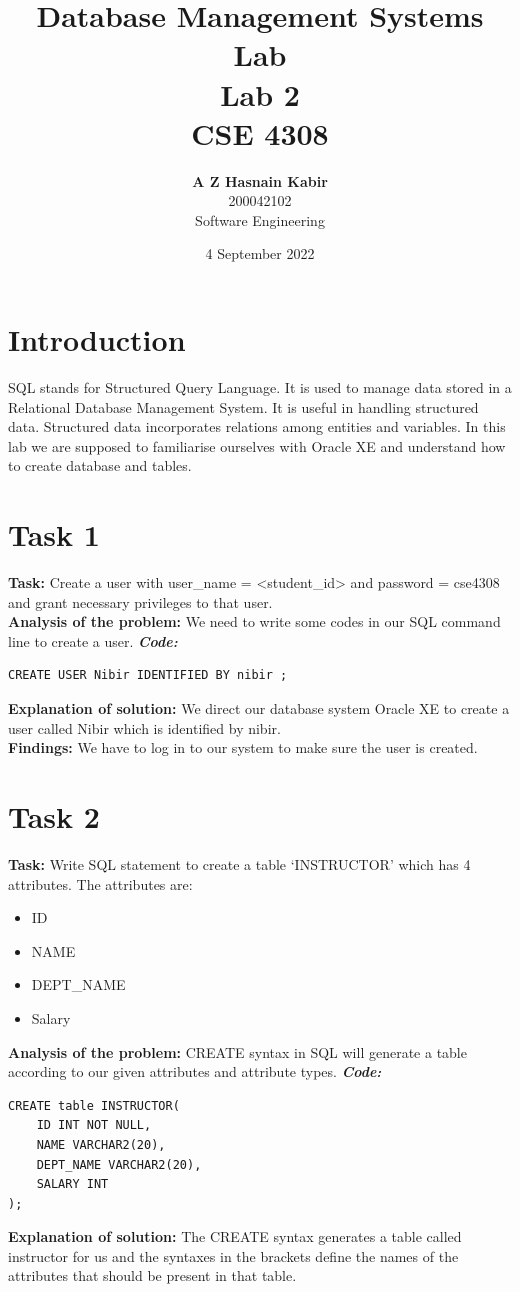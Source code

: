 \documentclass[a4paper, left=1in, right=1in,12pt]{article}
\title{Database Management Systems Lab\\Lab 2\\CSE 4308}
\author{\textbf{\Large A Z Hasnain Kabir}\\\Large 200042102\\\Large Software Engineering}
\date{4 September 2022}
\begin{document}
\maketitle

\section*{\large Introduction}
SQL stands for Structured Query Language. It is used to manage data stored in a Relational Database Management System. It is useful in handling structured data. Structured data incorporates relations among entities and variables. In this lab we are supposed to familiarise ourselves with Oracle XE and understand how to create database and tables.
\section*{Task 1}
\textbf{Task: }Create a user with user\_name = <student\_id> and password = cse4308 and grant necessary privileges to that user.\\
\textbf{Analysis of the problem: }We need to write some codes in our SQL command line to create a user.\newline\newline
\textbf{\textit{\large Code:}}\newline
\begin{verbatim}
CREATE USER Nibir IDENTIFIED BY nibir ;

\end{verbatim}
\textbf{Explanation of solution: }We direct our database system Oracle XE to create a user called Nibir which is identified by nibir.\\
\newline
\textbf{Findings: }We have to log in to our system to make sure the user is created.

\section*{Task 2}
\textbf{Task: }Write SQL statement to create a table ‘INSTRUCTOR’ which has 4 attributes. The attributes are:
\begin{itemize}
	\item ID
	\item NAME
	\item DEPT\_NAME
	\item Salary
\end{itemize}
\textbf{Analysis of the problem: }CREATE syntax in SQL will generate a table according to our given attributes and attribute types.\newline\newline
\textbf{\textit{\large Code:}}\newline
\begin{verbatim}
CREATE table INSTRUCTOR(
    ID INT NOT NULL,
    NAME VARCHAR2(20),
    DEPT_NAME VARCHAR2(20),
    SALARY INT
);
\end{verbatim}
\textbf{Explanation of solution: }The CREATE syntax generates a table called instructor for us and the syntaxes in the brackets define the names of the attributes that should be present in that table.
\end{document}
